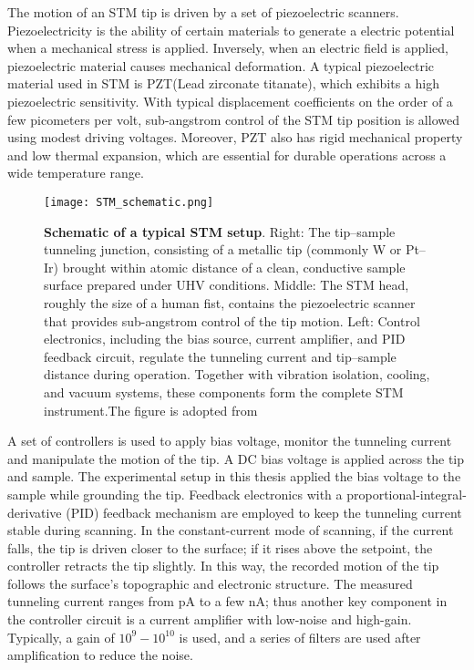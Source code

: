 The motion of an STM tip is driven by a set of piezoelectric scanners. Piezoelectricity is the ability of certain materials to generate a electric potential when a mechanical stress is applied. Inversely, when an electric field is applied, piezoelectric material causes mechanical deformation. A typical piezoelectric material used in STM is PZT(Lead zirconate titanate), which exhibits a high piezoelectric sensitivity. With typical displacement coefficients on the order of a few picometers per volt, sub-angstrom control of the STM tip position is allowed using modest driving voltages. Moreover, PZT also has rigid mechanical property and low thermal expansion, which are essential for durable operations across a wide temperature range.
 \begin{figure}
 	\centering
 	\texttt{[image: STM\_schematic.png]}
 	\caption[\textbf{Schematic of a typical STM setup}]{\textbf{Schematic of a typical STM setup}. Right: The tip–sample tunneling junction, consisting of a metallic tip (commonly W or Pt–Ir) brought within atomic distance of a clean, conductive sample surface prepared under UHV conditions. Middle: The STM head, roughly the size of a human fist, contains the piezoelectric scanner that provides sub-angstrom control of the tip motion. Left: Control electronics, including the bias source, current amplifier, and PID feedback circuit, regulate the tunneling current and tip–sample distance during operation. Together with vibration isolation, cooling, and vacuum systems, these components form the complete STM instrument.The figure is adopted from \cite{stuartScanningTunnellingMicroscopy2021}}
 	\label{fig:stm_schematics}
 \end{figure}
 
A set of controllers is used to apply bias voltage, monitor the tunneling current and manipulate the motion of the tip. A DC bias voltage is applied across the tip and sample. The experimental setup in this thesis applied the bias voltage to the sample while grounding the tip. Feedback electronics with a proportional-integral-derivative (PID) feedback mechanism are employed to keep the tunneling current stable during scanning. In the constant-current mode of scanning, if the current falls, the tip is driven closer to the surface; if it rises above the setpoint, the controller retracts the tip slightly. In this way, the recorded motion of the tip follows the surface's topographic and electronic structure. The measured tunneling current ranges from pA to a few nA; thus another key component in the controller circuit is a current amplifier with low-noise and high-gain. Typically, a gain of $10^9-10^{10}$ is used, and a series of filters are used after amplification to reduce the noise. 

